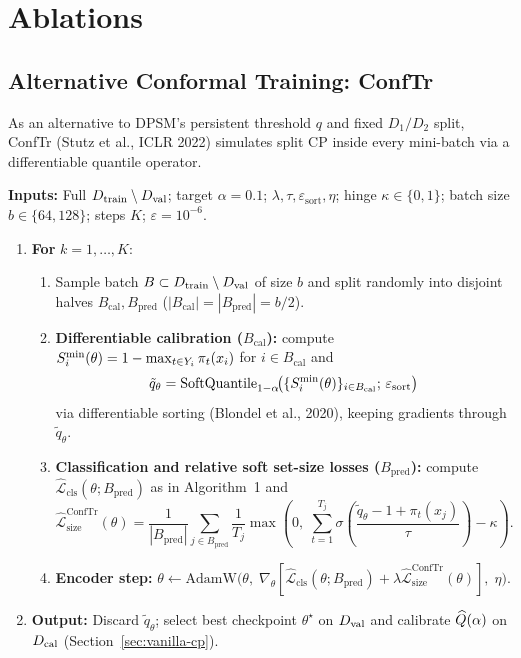 \documentclass[10pt,a4paper]{article}
\newcommand{\Lcls}{\widehat{\mathcal L}_{\mathrm{cls}}}
\newcommand{\Lsize}{\widehat{\mathcal L}_{\mathrm{size}}}
\begin{document}
\clearpage
\appendix
\section{Ablations}

\subsection{Alternative Conformal Training: ConfTr} \label{app:conftr}
As an alternative to DPSM's persistent threshold $q$ and fixed $D_1/D_2$ split, ConfTr (Stutz et al., ICLR 2022) simulates split CP inside every mini-batch via a differentiable quantile operator.

\begin{tcolorbox}[algbox,title={Algorithm 2 \textperiodcentered\ ConfTr Alternative (Differentiable In-Batch Calibration)}]
\small
\textbf{Inputs:} Full $D_{\mathrm{train}}\setminus D_{\mathrm{val}}$; target $\alpha=0.1$; $\lambda, \tau, \varepsilon_{\mathrm{sort}}, \eta$; hinge $\kappa\in\{0,1\}$; batch size $b\in\{64,128\}$; steps $K$; $\varepsilon=10^{-6}$.
\begin{enumerate}[leftmargin=1.4em,itemsep=2pt]
\item \textbf{For} $k=1,\dots,K$:
  \begin{enumerate}[label=\arabic{enumi}.\arabic*.,leftmargin=1.6em,itemsep=1.5pt]
  \item Sample batch $B\subset D_{\mathrm{train}}\setminus D_{\mathrm{val}}$ of size $b$ and split randomly into disjoint halves $B_{\mathrm{cal}}, B_{\mathrm{pred}}$ ($|B_{\mathrm{cal}}|=|B_{\mathrm{pred}}|=b/2$).
  \item \textbf{Differentiable calibration ($B_{\mathrm{cal}}$):} compute $S^{\min}_i(\theta)=1-\max_{t\in Y_i}\pi_t(x_i)$ for $i\in B_{\mathrm{cal}}$ and
  \[
  \tilde{q}_\theta = \mathrm{SoftQuantile}_{1-\alpha}\!\big(\{S^{\min}_i(\theta)\}_{i\in B_{\mathrm{cal}}};\,\varepsilon_{\mathrm{sort}}\big)
  \]
  via differentiable sorting (Blondel et al., 2020), keeping gradients through $\tilde{q}_\theta$.
  \item \textbf{Classification and relative soft set-size losses ($B_{\mathrm{pred}}$):} compute $\Lcls(\theta; B_{\mathrm{pred}})$ as in Algorithm~1 and
  \[
  \Lsize^{\mathrm{ConfTr}}(\theta) = \frac{1}{|B_{\mathrm{pred}}|}\sum_{j\in B_{\mathrm{pred}}}\frac{1}{T_j}\max\!\left(0,\; \sum_{t=1}^{T_j}\sigma\!\left(\frac{\tilde{q}_\theta - 1 + \pi_t(x_j)}{\tau}\right) - \kappa\right).
  \]
  \item \textbf{Encoder step:} $\theta \leftarrow \mathrm{AdamW}\big(\theta,\; \nabla_\theta[\Lcls(\theta; B_{\mathrm{pred}}) + \lambda\Lsize^{\mathrm{ConfTr}}(\theta)],\; \eta\big)$.
  \end{enumerate}
\item \textbf{Output:} Discard $\tilde{q}_\theta$; select best checkpoint $\theta^\star$ on $D_{\mathrm{val}}$ and calibrate $\widehat Q(\alpha)$ on $D_{\mathrm{cal}}$ (Section~\ref{sec:vanilla-cp}).
\end{enumerate}
\end{tcolorbox}
\end{document}
